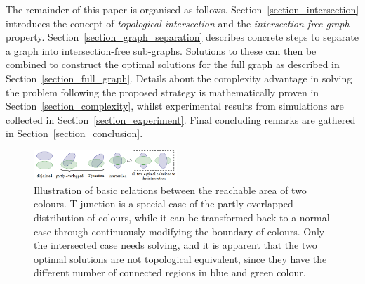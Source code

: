 \documentclass[conference]{IEEEtran}
\begin{document}
The remainder of this paper is organised as follows. Section~\ref{section_intersection} introduces the concept of \textit{topological intersection} and the \textit{intersection-free graph} property.
Section~\ref{section_graph_separation} describes concrete steps to separate a graph into intersection-free sub-graphs. 
Solutions to these can then be combined to construct the optimal solutions for the full graph as described in Section~\ref{section_full_graph}. Details  about the complexity advantage in solving the problem following the proposed strategy is mathematically proven in Section~\ref{section_complexity}, whilst experimental results from simulations are collected in Section~\ref{section_experiment}. Final concluding remarks are gathered in Section~\ref{section_conclusion}.

\begin{figure}[t]
\centering
\includegraphics[width = 0.48\textwidth]{figures/basic_shape_3}
\caption{Illustration of basic relations between the reachable area of two colours. T-junction is a special case of the partly-overlapped distribution of colours, while it can be transformed back to a normal case through continuously modifying the boundary of colours. Only the intersected case needs solving, and it is apparent that the two optimal solutions are not topological equivalent, since they have the different number of connected regions in blue and green colour. }\label{fig:basic_shape}
\end{figure}
\end{document}
